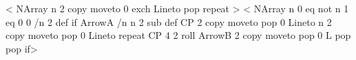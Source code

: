 \def\doqp@dots{Dot }
\def\endqp@dots{\end@SpecialObj}
\def\testqp@dots{\@psttrue}
%
\def\beginqp@bezier{/n 0 def \pst@oplineto}
\def\doqp@bezier{/n n 1 add def n 3 mod 0 eq { curveto } if }
\def\endqp@bezier{%
  \addto@pscode{n 3 mod { pop pop } repeat}
  \end@OpenObj}%
\def\testqp@bezier{%
  \ifshowpoints\else
    \ifx\psk@arrowA\@empty
      \ifx\psk@arrowB\@empty
        \@psttrue
      \fi
    \fi
  \fi}
%
\def\beginqp@cbezier{/n 0 def moveto }
\def\doqp@cbezier{\doqp@bezier}
\def\endqp@cbezier{%
  \addto@pscode{n 3 mod { pop pop } repeat closepath}
  \end@ClosedObj}%
\def\testqp@cbezier{\ifshowpoints\else\@psttrue\fi}
%
\def\psLineToYAxis@ii{%
\addto@pscode{\pst@cp \psline@iii \tx@LineToYAxis}%
\end@OpenObj}
%
\def\tx@LineToYAxis{LineToYAxis }
%
<{
  NArray            %
  n { 2 copy moveto %
    0 exch Lineto   %
    pop             %
  } repeat
}>
%
\def\psLineToXAxis@ii{%
\addto@pscode{\pst@cp \psline@iii \tx@LineToXAxis}%
\end@OpenObj}
%
\def\tx@LineToXAxis{LineToXAxis }
%
<{%
NArray
n 0 eq not
  { n 1 eq { 0 0 /n 2 def } if
    ArrowA
    /n n 2 sub def
    CP 2 copy moveto pop 0 Lineto
    n { 2 copy moveto pop 0 Lineto } repeat
    CP
    4 2 roll
    ArrowB
    2 copy moveto pop 0
    L
    pop pop } if}>
%
\def\psdataplot{\def\pst@par{}\pst@object{dataplot}}
\def\dataplot{\def\pst@par{}\pst@object{dataplot}}
\def\dataplot@i#1{%
  \pst@killglue
  \begingroup
    \use@par
    \@pstfalse
    \@nameuse{testqp@\psplotstyle}%
    \if@pst
      \dataplot@ii{\addto@pscode{#1}}%
    \else
      \listplot@ii{\addto@pscode{#1}}%
    \fi
  \endgroup
  \ignorespaces}
%
\def\dataplot@ii#1{%
  \@nameuse{beginplot@\psplotstyle}%
    \addto@pscode{%
      /Dx { \pst@number\psxunit mul /D { Dy } def } def
      /Dy { \pst@number\psyunit mul Do /D { Dx } def } def
      /D { /D { Dx } def } def
      /Do {
        \@nameuse{beginqp@\psplotstyle}%
        /Do { \@nameuse{doqp@\psplotstyle}} def
      } def}%
    #1%
    \addto@pscode{ D }%
  \@nameuse{endqp@\psplotstyle}}
%
\def\psfileplot{\def\pst@par{}\pst@object{fileplot}}
\def\fileplot{\def\pst@par{}\pst@object{fileplot}}
\def\fileplot@i#1{%
  \pst@killglue%
  \begingroup%
    \use@par%
    \@pstfalse%
    \@nameuse{testqp@\psplotstyle}%
    \if@pst\dataplot@ii{\pst@readfile{#1}}\else\listplot@ii{\pst@altreadfile{#1}}\fi%
  \endgroup%
  \ignorespaces}
